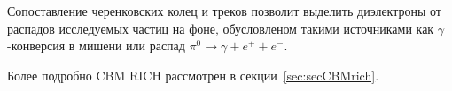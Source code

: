 Сопоставление черенковских колец и треков позволит выделить диэлектроны от распадов исследуемых частиц на фоне, обусловленом такими источниками как $\gamma$-конверсия в мишени или распад $\pi^{0} \rightarrow \gamma + e^{+} + e^{-}$.


Более подробно CBM RICH рассмотрен в секции~\ref{sec:secCBMrich}.

